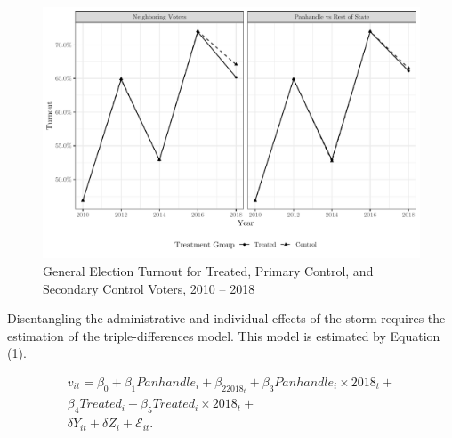\documentclass[
  12pt,
]{article}
\begin{document}
\begin{figure}[h]

{\centering \includegraphics{hurricane_michael_files/figure-latex/tripd-to-chunk-1} 

}

\caption{\label{fig:trip-diff-plot}General Election Turnout for Treated, Primary Control, and Secondary Control Voters, 2010 -- 2018}\label{fig:tripd-to-chunk}
\end{figure}

Disentangling the administrative and individual effects of the storm requires the estimation of the triple-differences model. This model is estimated by Equation (1).

\begin{gather}
\label{eq:1}
v_{it}=\beta_0+\beta_1Panhandle_{i}+\beta_22018_{t}+\beta_3Panhandle_{i}\times 2018_{t} + \nonumber \\
\beta_4Treated_{i} + \beta_5Treated_{i}\times 2018_{t} + \\
\delta{Y}_{it} + \delta{Z}_{i} + \mathcal{E}_{it}. \nonumber
\end{gather}
\end{document}
